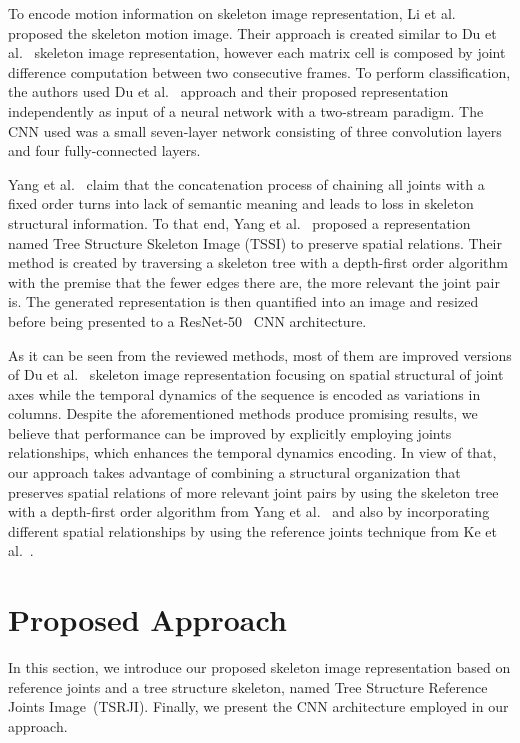 \documentclass[10pt,conference]{IEEEtran}
\def\metodo{Tree Structure Reference Joints Image}
\def\sigla{TSRJI}
\def\metodosigla{\metodo~(\sigla)}
\begin{document}
To encode motion information on skeleton image representation, Li et al.~\cite{Li:2017, Li:2018} proposed the skeleton motion image. Their approach is created similar to Du et al.~\cite{Du:2015} skeleton image representation, however each matrix cell is composed by joint difference computation between two consecutive frames. To perform classification, the authors used Du et al.~\cite{Du:2015} approach and their proposed representation independently as input of a neural network with a two-stream paradigm. The CNN used was a small seven-layer network  consisting of three convolution layers and four fully-connected layers.

Yang et al.~\cite{Yang:2018} claim that the concatenation process of chaining all joints with a fixed order turns into lack of semantic meaning and leads to loss in skeleton structural information. To that end, Yang et al.~\cite{Yang:2018} proposed a representation named Tree Structure Skeleton Image (TSSI) to preserve spatial relations. Their method is created by traversing a skeleton tree with a depth-first order algorithm with the premise that the fewer edges there are, the more relevant the joint pair is. The generated representation is then quantified into an image and resized before being presented to a ResNet-50~\cite{He:2016} CNN architecture.

As it can be seen from the reviewed methods, most of them are improved versions of Du et al.~\cite{Du:2015} skeleton image representation focusing on spatial structural of joint axes while the temporal dynamics of the sequence is encoded as variations in columns. Despite the aforementioned methods produce promising results, we believe that performance can be improved by explicitly employing joints relationships, which enhances the temporal dynamics encoding. In view of that, our approach takes advantage of combining a structural organization that preserves spatial relations of more relevant joint pairs by using the skeleton tree with a depth-first order algorithm from Yang et al.~\cite{Yang:2018} and also by incorporating different spatial relationships by using the reference joints technique from Ke et al.~\cite{Ke:2017}.




\section{Proposed Approach}\label{approach}

In this section, we introduce our proposed skeleton image representation based on reference joints and a tree structure skeleton, named \metodosigla. Finally, we present the CNN architecture employed in our approach.
\end{document}

